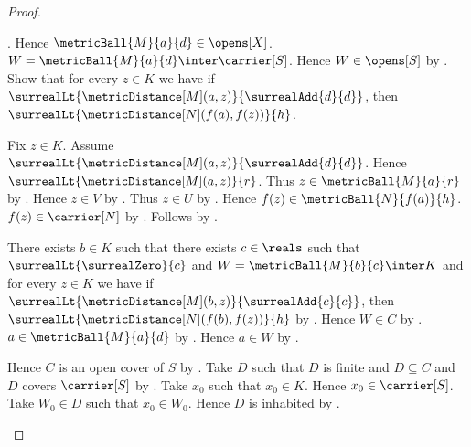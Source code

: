 \begin{proof}
\begin{subproof}
\begin{byCase}
\begin{subproof}
\begin{subproof}
                        .
                    Hence $\metricBall{M}{a}{d}\in\opens[X]$.
                    $W=\metricBall{M}{a}{d}\inter\carrier[S]$.
                    Hence $W\in\opens[S]$ by
                        .
                    Show that for every $z\in K$ we have if
                        $\surrealLt{\metricDistance[M](a,z)}
                            {\surrealAdd{d}{d}}$, then
                        $\surrealLt{\metricDistance[N](f(a),f(z))}{h}$.
                    \begin{subproof}
                        Fix $z\in K$.
                        Assume $\surrealLt{\metricDistance[M](a,z)}
                            {\surrealAdd{d}{d}}$.
                        Hence $\surrealLt{\metricDistance[M](a,z)}{r}$.
                        Thus $z\in\metricBall{M}{a}{r}$ by
                            .
                        Hence $z\in V$ by .
                        Thus $z\in U$ by .
                        Hence $f(z)\in\metricBall{N}{f(a)}{h}$.
                        $f(z)\in\carrier[N]$ by
                            .
                        Follows by .
                    \end{subproof}
                    There exists $b\in K$ such that there exists
                        $c\in\reals$ such that
                        $\surrealLt{\surrealZero}{c}$ and
                        $W=\metricBall{M}{b}{c}\inter K$ and
                        for every $z\in K$ we have if
                            $\surrealLt{\metricDistance[M](b,z)}
                                {\surrealAdd{c}{c}}$, then
                            $\surrealLt{\metricDistance[N](f(b),f(z))}{h}$
                        by \auto.
                    Hence $W\in C$ by \auto.
                    $a\in\metricBall{M}{a}{d}$ by
                        .
                    Hence $a\in W$ by .
                \end{subproof}
            \end{subproof}
            Hence $C$ is an open cover of $S$ by .
            Take $D$ such that $D$ is finite and $D\subseteq C$ and
                $D$ covers $\carrier[S]$ by .
            Take $x_0$ such that $x_0\in K$.
            Hence $x_0\in\carrier[S]$.
            Take $W_0\in D$ such that $x_0\in W_0$.
            Hence $D$ is inhabited by \auto.


\end{byCase}
\end{subproof}
\end{proof}
